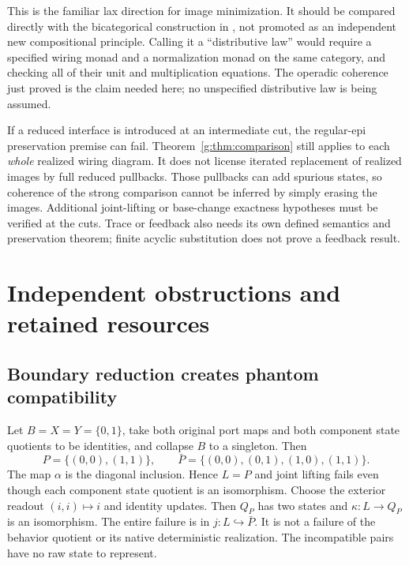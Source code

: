 \documentclass[11pt]{article}
\theoremstyle{definition}
\theoremstyle{remark}\newtheorem{remark}[theorem]{Remark}
\begin{document}
This is the familiar lax direction for image minimization. It should be
compared directly with the bicategorical construction in \cite{RSW},
not promoted as an independent new compositional principle. Calling it a
``distributive law'' would require a specified wiring monad and a
normalization monad on the same category, and checking all of their unit
and multiplication equations. The operadic coherence just proved is the
claim needed here; no unspecified distributive law is being assumed.

If a reduced interface is introduced at an intermediate cut, the
regular-epi preservation premise can fail. Theorem~\ref{g:thm:comparison}
still applies to each \emph{whole} realized wiring diagram. It does not
license iterated replacement of realized images by full reduced
pullbacks. Those pullbacks can add spurious states, so coherence of the
strong comparison cannot be inferred by simply erasing the images.
Additional joint-lifting or base-change exactness hypotheses must be
verified at the cuts. Trace or feedback also needs its own defined
semantics and preservation theorem; finite acyclic substitution does not
prove a feedback result.



\section{Independent obstructions and retained resources}
\subsection{Boundary reduction creates phantom compatibility}
Let $B=X=Y=\{0,1\}$, take both original port maps and both component
state quotients to be identities, and collapse $B$ to a singleton.
Then
\[
 P=\{(0,0),(1,1)\},\qquad
 \bar P=\{(0,0),(0,1),(1,0),(1,1)\}.
\]
The map $\alpha$ is the diagonal inclusion. Hence $L=P$ and joint
lifting fails even though each component state quotient is an
isomorphism. Choose the exterior readout $(i,i)\mapsto i$ and identity
updates. Then $Q_P$ has two states and $\kappa:L\to Q_P$ is an
isomorphism. The entire failure is in $j:L\hookrightarrow\bar P$.
It is not a failure of the behavior quotient or its native deterministic
realization. The incompatible pairs have no raw state to represent.
\end{document}
